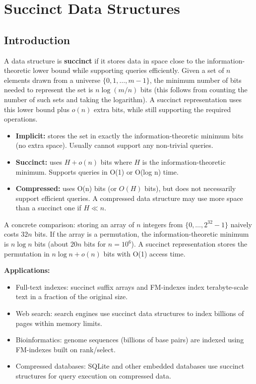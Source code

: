 \chapter{Succinct Data Structures}\label{ch22:succinct-data-structures}

\section{Introduction}\label{sec22:introduction}

A data structure is \textbf{succinct} if it stores data in space close to the information-theoretic lower bound while supporting queries efficiently. Given a set of $n$ elements drawn from a universe $\{0, 1, \ldots, m-1\}$, the minimum number of bits needed to represent the set is $n \log(m/n)$ bits (this follows from counting the number of such sets and taking the logarithm). A succinct representation uses this lower bound plus $o(n)$ extra bits, while still supporting the required operations.

\begin{itemize}
\item \textbf{Implicit:} stores the set in exactly the information-theoretic minimum bits (no extra space). Usually cannot support any non-trivial queries.
\item \textbf{Succinct:} uses $H + o(n)$ bits where $H$ is the information-theoretic minimum. Supports queries in O(1) or O(log n) time.
\item \textbf{Compressed:} uses O(n) bits (or $O(H)$ bits), but does not necessarily support efficient queries. A compressed data structure may use more space than a succinct one if $H \ll n$.
\end{itemize}

A concrete comparison: storing an array of $n$ integers from $\{0, \ldots, 2^{32}-1\}$ naively costs $32n$ bits. If the array is a permutation, the information-theoretic minimum is $n \log n$ bits (about $20n$ bits for $n = 10^6$). A succinct representation stores the permutation in $n \log n + o(n)$ bits with O(1) access time.

\textbf{Applications:}
\begin{itemize}
\item Full-text indexes: succinct suffix arrays and FM-indexes index terabyte-scale text in a fraction of the original size.
\item Web search: search engines use succinct data structures to index billions of pages within memory limits.
\item Bioinformatics: genome sequences (billions of base pairs) are indexed using FM-indexes built on rank/select.
\item Compressed databases: SQLite and other embedded databases use succinct structures for query execution on compressed data.
\end{itemize}

